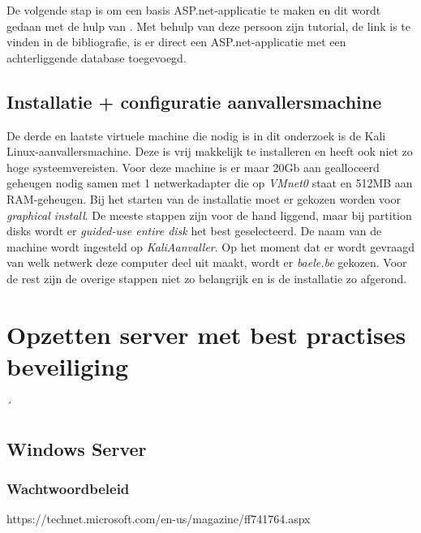 \documentclass[pdftex,a4paper,12pt]{report}
\begin{document}
De volgende stap is om een basis ASP.net-applicatie te maken en dit wordt gedaan met de hulp van \cite{Nuckolls2011}. Met behulp van deze persoon zijn tutorial, de link is te vinden in de bibliografie, is er direct een ASP.net-applicatie met een achterliggende database toegevoegd. \newline

\section{Installatie + configuratie aanvallersmachine}
De derde en laatste virtuele machine die nodig is in dit onderzoek is de Kali Linux-aanvallersmachine. Deze is vrij makkelijk te installeren en heeft ook niet zo hoge systeemvereisten. Voor deze machine is er maar 20Gb aan gealloceerd geheugen nodig samen met 1 netwerkadapter die op \textit{VMnet0} staat en 512MB aan RAM-geheugen. Bij het starten van de installatie moet er gekozen worden voor \textit{graphical install}. De meeste stappen zijn voor de hand liggend, maar bij partition disks wordt er \textit{guided-use entire disk} het best geselecteerd. De naam van de machine wordt ingesteld op \textit{KaliAanvaller}. Op het moment dat er wordt gevraagd van welk netwerk deze computer deel uit maakt, wordt er \textit{baele.be} gekozen. Voor de rest zijn de overige stappen niet zo belangrijk en is de installatie zo afgerond.

\chapter{Opzetten server met best practises beveiliging}
´%

\section{Windows Server}
\subsection{Wachtwoordbeleid}
https://technet.microsoft.com/en-us/magazine/ff741764.aspx

\citep{Stanek2009}
\end{document}
